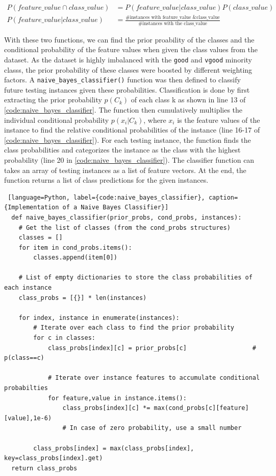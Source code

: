 \documentclass[a4paper]{article}
\begin{document}
\begin{equation}
  \begin{aligned}
    P(feature\_value \cap class\_value) &= P(feature\_value|class\_value)P(class\_value)\\
    P(feature\_value|class\_value) &= \frac{\text{\# instances with feature\_value \& class\_value}}{\text{\# instances with the class\_value}}
  \end{aligned} 
\end{equation}

With these two functions, we can find the prior proability of the classes and the conditional probability of the feature values when given the class values from the dataset. As the dataset is highly imbalanced with the \lstinline{good} and \lstinline{vgood} minority classs, the prior probability of these classes were boosted by different weighting factors. A \lstinline{naive_bayes_classifier()} function was then defined to classify future testing instances given these probabilities. Classification is done by first extracting the prior probability $p(C_k)$ of each class k as shown in line 13 of \autoref{code:naive_bayes_classifier}. The function then cumulatively multiplies the individual conditional probability $p(x_i|C_k)$, where $x_i$ is the feature values of the instance to find the relative conditional probabilities of the instance (line 16-17 of \autoref{code:naive_bayes_classifier}). For each testing instance, the function finds the class probabilities and categorizes the instance as the class with the highest probability (line 20 in \autoref{code:naive_bayes_classifier}). The classifier function can takes an array of testing instances as a list of feature vectors. At the end, the function returns a list of class predictions for the given instances.

\begin{lstlisting} [language=Python, label={code:naive_bayes_classifier}, caption={Implementation of a Naive Bayes Classifier}]
  def naive_bayes_classifier(prior_probs, cond_probs, instances):
    # Get the list of classes (from the cond_probs structures)
    classes = []
    for item in cond_probs.items():
        classes.append(item[0])

    # List of empty dictionaries to store the class probabilities of each instance
    class_probs = [{}] * len(instances)                                        
    
    for index, instance in enumerate(instances):
        # Iterate over each class to find the prior probability 
        for c in classes:
            class_probs[index][c] = prior_probs[c]                  # p(class==c)

            # Iterate over instance features to accumulate conditional probabilties
            for feature,value in instance.items():
                class_probs[index][c] *= max(cond_probs[c][feature][value],1e-6)       
                # In case of zero probability, use a small number
        
        class_probs[index] = max(class_probs[index], key=class_probs[index].get)
  return class_probs
\end{lstlisting}
\end{document}
